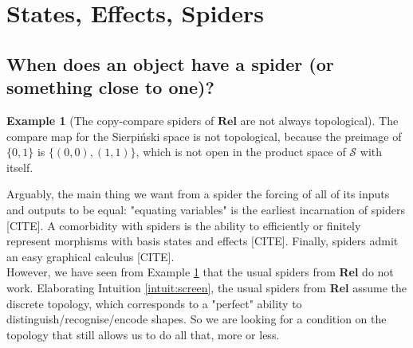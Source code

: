 \documentclass{tufte-handout}
\theoremstyle{definition}
\newtheorem{example}[theorem]{Example}
\newtheorem{rem}[theorem]{Reminder}
\newtheorem{intuition}[theorem]{Intuition}
\begin{document}
\section{States, Effects, Spiders}




\subsection{When does an object have a spider (or something close to one)?}


\begin{example}[The copy-compare spiders of $\mathbf{Rel}$ are not always topological]\label{ex:compnotspider}
The compare map for the Sierpi\'{n}ski space is not topological, because the preimage of $\{0,1\}$ is $\{(0,0),(1,1)\}$, which is not open in the product space of $\mathcal{S}$ with itself.
\end{example}

 Arguably, the main thing we want from a spider the forcing of all of its inputs and outputs to be equal: "equating variables" is the earliest incarnation of spiders [CITE]. A comorbidity with spiders is the ability to efficiently or finitely represent morphisms with basis states and effects [CITE]. Finally, spiders admit an easy graphical calculus [CITE].\\

However, we have seen from Example \ref{ex:compnotspider} that the usual spiders from \textbf{Rel} do not work. Elaborating Intuition \ref{intuit:screen}, the usual spiders from \textbf{Rel} assume the discrete topology, which corresponds to a "perfect" ability to distinguish/recognise/encode shapes. So we are looking for a condition on the topology that still allows us to do all that, more or less.
\end{document}
